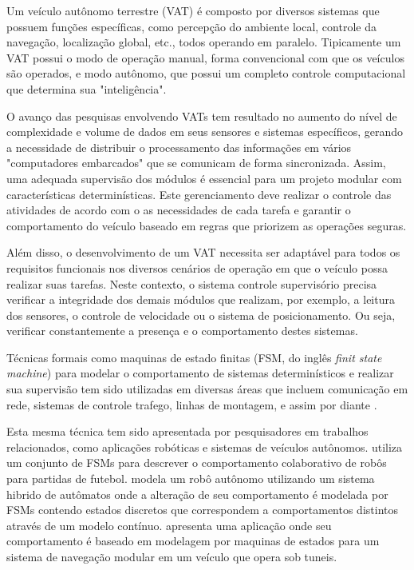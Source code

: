 \documentclass[conference]{IEEEtran}
\begin{document}
Um veículo autônomo terrestre (VAT) é composto por diversos sistemas que possuem funções específicas, como percepção do ambiente local, controle da navegação, localização global, etc., todos operando em paralelo. Tipicamente um VAT possui o modo de operação manual, forma convencional com que os veículos são operados, e modo autônomo, que possui um completo controle computacional que determina sua "inteligência".

O avanço das pesquisas envolvendo VATs tem resultado no aumento do nível de complexidade e volume de dados em seus sensores e sistemas específicos, gerando a necessidade de distribuir o processamento das informações em vários "computadores embarcados" que se comunicam de forma sincronizada. Assim, uma adequada supervisão dos módulos é essencial para um projeto modular com características determinísticas. Este gerenciamento deve realizar o controle das atividades de acordo com o as necessidades de cada tarefa e garantir o comportamento do veículo baseado em regras que priorizem as operações seguras.

Além disso, o desenvolvimento de um VAT necessita ser adaptável para todos os requisitos funcionais nos diversos cenários de operação em que o veículo possa realizar suas tarefas. Neste contexto, o sistema controle supervisório precisa verificar a integridade dos demais módulos que realizam, por exemplo, a leitura dos sensores, o controle de velocidade ou o sistema de posicionamento. Ou seja, verificar constantemente a presença e o comportamento destes sistemas.

Técnicas formais como maquinas de estado finitas (FSM, do inglês \textit{finit state machine}) para modelar o comportamento de sistemas determinísticos e realizar sua supervisão tem sido utilizadas em diversas áreas que incluem comunicação em rede, sistemas de controle trafego, linhas de montagem, e assim por diante \cite{event_comparative_study} \cite{event_des_line_945770}. 

Esta mesma técnica tem sido apresentada por pesquisadores em trabalhos relacionados, como aplicações robóticas e sistemas de veículos autônomos. \cite{event_supervisory_soccer_994642} utiliza um conjunto de FSMs para descrever o comportamento colaborativo de robôs para partidas de futebol. \cite{event_hybrid_automata_827799} modela um robô autônomo utilizando um sistema hibrido de autômatos onde a alteração de seu comportamento é modelada por FSMs contendo estados discretos que correspondem a comportamentos distintos através de um modelo contínuo. \cite{event_modular_navigation} apresenta uma aplicação onde seu comportamento é baseado em modelagem por maquinas de estados para um sistema de navegação modular em um veículo que opera sob tuneis.
\end{document}
